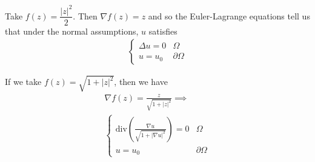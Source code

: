 \documentclass{memoir}
\begin{document}
\begin{exmp}
	Take \(f(z) = \dfrac{\left| z \right|^2}{2}\). Then \(\nabla f(z) = z\) and so the Euler-Lagrange equations tell us that under the normal assumptions, \(u\) satisfies
	\begin{align*}
		\begin{cases}
			\Delta u = 0 & \Omega \\
			u = u_0 & \partial \Omega 
		\end{cases}
	\end{align*}
\end{exmp}

\begin{exmp}
	If we take \(f(z) = \sqrt{1+\left| z \right|^2} \), then we have
	\begin{align*}
		\nabla f(z) = \frac{z}{\sqrt{1+\left| z \right|^2} }\implies\\
		\begin{cases}
			\textrm{div}\left( \frac{\nabla u}{\sqrt{1+\left| \nabla u \right|^2} } \right) = 0 & \Omega \\
			u = u_0 & \partial \Omega 
		\end{cases}
	\end{align*}
\end{exmp}
\end{document}
